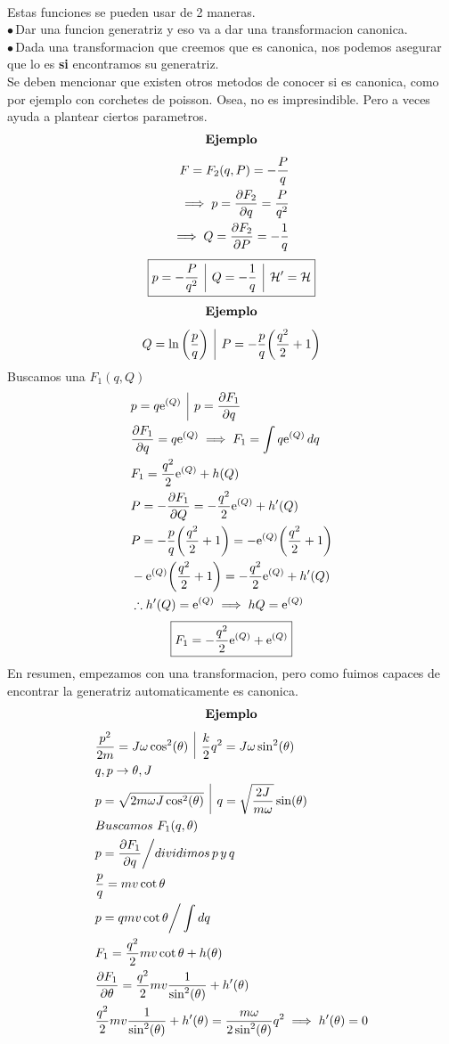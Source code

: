 \documentclass[12pt]{article}
\renewcommand{\H}{\mathcal{H}}
\newcommand{\en}[1]{\[\boxed{#1}\]}
\newcommand{\e}[1]{\mathrm{e}^{\qty(#1)}}
\newcommand{\lnn}[1]{\ln{\qty(#1)}}
\newcommand{\ej}{\[\textrm{\textbf{Ejemplo}} \]}
\newcommand{\vl}{\,\,\, \vline \,\,\,}
\newcommand{\pua}{$\bullet \, $}
\newcommand{\rosa}[1]{{\color{fucsia}#1}}
\begin{document}
\hrulefill\\
\vspace{3mm}
\rosa{Estas funciones se pueden usar de 2 maneras.\\
\pua Dar una funcion generatriz y eso va a dar una transformacion canonica.\\
\pua Dada una transformacion que creemos que es canonica, nos podemos asegurar que lo es \textbf{si} encontramos su generatriz.\\
Se deben mencionar que existen otros metodos de conocer si es canonica, como por ejemplo con corchetes de poisson. Osea, no es impresindible. Pero a veces ayuda a plantear ciertos parametros.}\\
\vspace{3mm}
\hrulefill
\vspace{3mm}
\ej
\begin{align}
F=F_2\qty(q,P)	= - \frac{P}{q}\\
\implies p= \pdv{F_2}{q}= \frac{P}{q^2}\\
\implies Q= \pdv{F_2}{P}= -\frac{1}{q}
\end{align}
\en{p= - \frac{P}{q^2} \vl Q= -\frac{1}{q}\vl \H' = \H}
\ej
\begin{align}
Q = \lnn{\frac{p}{q}} \vl 	P=-\frac{p}{q}\qty(\frac{q^2}{2}+1)
\end{align}
Buscamos una $F_1(q,Q)$
\begin{align}
&p= q \e{Q} \vl 	p= \pdv{F_1}{q}\\
&\pdv{F_1}{q}= q \e{Q} \implies F_1 = \int q \e{Q} \, dq\\
&F_1= \frac{q^2}{2}\e{Q} + h(Q)\\
&P= - \pdv{F_1}{Q} = - \frac{q^2}{2}\e{Q} + h'(Q)\\
&P=-\frac{p}{q}\qty(\frac{q^2}{2}+1)= -\e{Q} \qty(\frac{q^2}{2}+1)\\
&-\e{Q} \qty(\frac{q^2}{2}+1) =   - \frac{q^2}{2}\e{Q} + h'(Q)\\
&\therefore h'(Q)= \e{Q} \implies h{Q}=\e{Q}
\end{align}
\en{F_1 = - \frac{q^2}{2}\e{Q} + \e{Q} }
En resumen, empezamos con una transformacion, pero como fuimos capaces de encontrar la generatriz automaticamente es canonica.
\ej
\begin{align}
&\frac{p^2}{2m}=J\omega \cos[2](\theta)	\vl \frac{k}{2}q^2 = J \omega \sin[2](\theta)\\
&q,p \rightarrow \theta,J\\
&p=\sqrt{2m\omega J \cos[2](\theta)}\vl q= \sqrt{\frac{2J}{m\omega}} \sin(\theta)\\
&Buscamos\,\, F_1(q,\theta)\\
&p=\pdv{F_1}{q} \bigg/ dividimos\, p\,y\,q\\
&\frac{p}{q}=mv\cot{\theta}\\
&p=qmv \cot{\theta}\bigg/ \int dq\\
&F_1 = \frac{q^2}{2}mv \cot{\theta} + h(\theta)\\
&\pdv{F_1}{\theta}= \frac{q^2}{2}mv \frac{1}{\sin[2](\theta)} + h'(\theta)\\
&\frac{q^2}{2}mv \frac{1}{\sin[2](\theta)} + h'(\theta)= \frac{m\omega}{2 \sin[2](\theta)}q^2 \implies h'(\theta)=0
\end{align}
\end{document}
